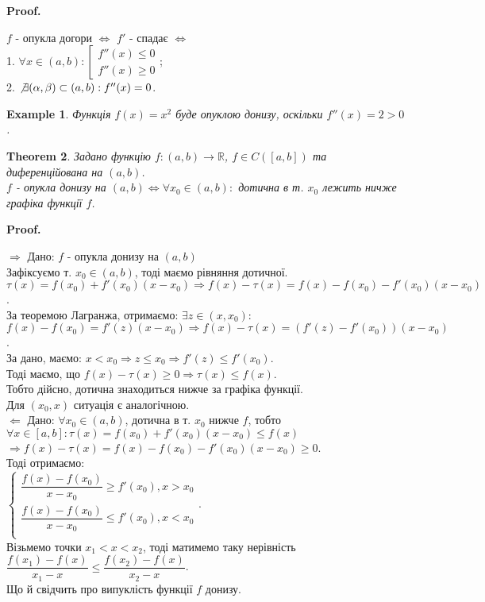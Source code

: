 \documentclass[a4paper, 14pt]{article}
\makeatletter
\def\qed{$\blacksquare$}
\def\rightproof{$\boxed{\Rightarrow}$ }
\def\leftproof{$\boxed{\Leftarrow}$ }
\theoremstyle{theoremdd}
\newtheorem{theorem}{Theorem}[subsection]
\theoremstyle{theoremdd}
\theoremstyle{theoremdd}
\theoremstyle{theoremdd}
\newtheorem{example}[theorem]{Example}
\theoremstyle{theoremdd}
\theoremstyle{theoremdd}
\theoremstyle{theoremdd}
\theoremstyle{theoremdd}
\renewenvironment{proof}[1][Proof.\\]{\par
\pushQED{\hfill \qed}%
\normalfont \topsep6\p@\@plus6\p@\relax
\trivlist
\item\relax
{\bfseries
#1\@addpunct{.}}\hspace\labelsep\ignorespaces
}{%
\popQED\endtrivlist\@endpefalse
}
\makeatother
\begin{document}
\begin{proof}
$f$ - опукла догори $\iff$ $f'$ - спадає $\iff$ \\
1. $\forall x \in (a,b): \left[ \begin{gathered} f''(x) \leq 0 \\ f''(x) \geq 0 \end{gathered} \right.$;\\
2. $\not\exists (\alpha, \beta) \subset (a,b): f''(x) = 0$.
\end{proof}

\begin{example}
Функція $f(x) = x^2$ буде опуклою донизу, оскільки $f''(x) = 2 > 0$.
\end{example}

\begin{theorem}
Задано функцію $f: (a,b) \to \mathbb{R}$, $f \in C([a,b])$ та диференційована на $(a,b)$.\\
$f$ - опукла донизу на $(a,b) \iff \forall x_0 \in (a,b):$ дотична в т. $x_0$ лежить ничже графіка функції $f$.
\end{theorem}

\begin{proof}
\rightproof Дано: $f$ - опукла донизу на $(a,b)$\\
Зафіксуємо т. $x_0 \in (a,b)$, тоді маємо рівняння дотичної.\\
$\tau(x) = f(x_0) + f'(x_0)(x-x_0) \Rightarrow f(x) - \tau(x) = f(x) - f(x_0) - f'(x_0)(x-x_0)$.\\
За теоремою Лагранжа, отримаємо: $\exists z \in (x,x_0):$ \\
$f(x) - f(x_0) = f'(z)(x-x_0) \Rightarrow f(x) - \tau(x) = (f'(z) - f'(x_0))(x-x_0)$.\\
За дано, маємо: $x < x_0 \Rightarrow z \leq x_0 \Rightarrow f'(z) \leq f'(x_0)$.\\
Тоді маємо, що $f(x) - \tau(x) \geq 0 \Rightarrow \tau(x) \leq f(x)$.\\
Тобто дійсно, дотична знаходиться нижче за графіка функції.\\
Для $(x_0,x)$ ситуація є аналогічною.
\bigskip \\
\leftproof Дано: $\forall x_0 \in (a,b)$, дотична в т. $x_0$ нижче $f$, тобто\\
$\forall x \in [a,b]: \tau(x) = f(x_0) + f'(x_0)(x-x_0) \leq f(x)$\\
$\Rightarrow f(x) - \tau(x) = f(x) - f(x_0) - f'(x_0)(x-x_0) \geq 0$.\\
Тоді отримаємо:\\
$\begin{cases}
\dfrac{f(x)-f(x_0)}{x-x_0} \geq f'(x_0), x > x_0 \\
\dfrac{f(x)-f(x_0)}{x-x_0} \leq f'(x_0), x < x_0 \\
\end{cases}
$.\\
Візьмемо точки $x_1 < x < x_2$, тоді матимемо таку нерівність\\
$\dfrac{f(x_1)-f(x)}{x_1-x} \leq \dfrac{f(x_2)-f(x)}{x_2-x}$.\\
Що й свідчить про випуклість функції $f$ донизу.
\end{proof}
\end{document}
